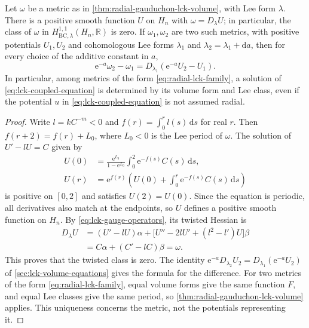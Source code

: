 \begin{proposition}\label{prop:radial-lck-positive-twisted-potential}
Let $\omega$ be a metric as in \cref{thm:radial-gauduchon-lck-volume}, with Lee form $\lambda$. There is a positive smooth function $U$ on $H_n$ with $\omega=D_\lambda U$; in particular, the class of $\omega$ in $H^{1,1}_{\mathrm{BC},\lambda}(H_n,\mathbb R)$ is zero. If $\omega_1,\omega_2$ are two such metrics, with positive potentials $U_1,U_2$ and cohomologous Lee forms $\lambda_1$ and $\lambda_2=\lambda_1+\mathrm da$, then for every choice of the additive constant in $a$,
\[
 \mathrm e^{-a}\omega_2-\omega_1=D_{\lambda_1}(\mathrm e^{-a}U_2-U_1).
\]
In particular, among metrics of the form \eqref{eq:radial-lck-family}, a solution of \eqref{eq:lck-coupled-equation} is determined by its volume form and Lee class, even if the potential $u$ in \eqref{eq:lck-coupled-equation} is not assumed radial.
\end{proposition}
\begin{proof}
Write $l=kC^{-m}<0$ and $f(r)=\int_0^rl(s)\,\mathrm ds$ for real $r$. Then $f(r+2)=f(r)+L_0$, where $L_0<0$ is the Lee period of $\omega$. The solution of $U'-lU=C$ given by
\[
 \begin{aligned}
 U(0)&=\frac{\mathrm e^{L_0}}{1-\mathrm e^{L_0}}
       \int_0^2\mathrm e^{-f(s)}C(s)\,\mathrm ds,\\
 U(r)&=\mathrm e^{f(r)}
       \left(U(0)+\int_0^r\mathrm e^{-f(s)}C(s)\,\mathrm ds\right)
 \end{aligned}
\]
is positive on $[0,2]$ and satisfies $U(2)=U(0)$. Since the equation is periodic, all derivatives also match at the endpoints, so $U$ defines a positive smooth function on $H_n$. By \eqref{eq:lck-gauge-operators}, its twisted Hessian is
\[
 \begin{split}
 D_\lambda U
 &=(U'-lU)\alpha+
   \bigl[U''-2lU'+(l^2-l')U\bigr]\beta\\
 &=C\alpha+(C'-lC)\beta=\omega.
 \end{split}
\]
This proves that the twisted class is zero. The identity
$\mathrm e^{-a}D_{\lambda_2}U_2=D_{\lambda_1}(\mathrm e^{-a}U_2)$ of \cref{sec:lck-volume-equations} gives the formula for the difference. For two metrics of the form \eqref{eq:radial-lck-family}, equal volume forms give the same function $F$, and equal Lee classes give the same period, so \cref{thm:radial-gauduchon-lck-volume} applies. This uniqueness concerns the metric, not the potentials representing it.
\end{proof}


